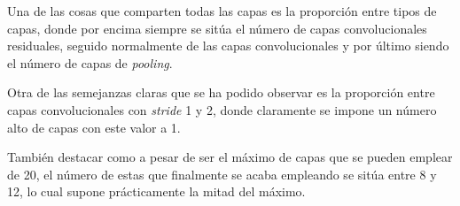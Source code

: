 Una de las cosas que comparten todas las capas es la proporción entre tipos de capas, donde por encima siempre se sitúa el número de capas convolucionales residuales, seguido normalmente de las capas convolucionales y por último siendo el número de capas de \textit{pooling}.

Otra de las semejanzas claras que se ha podido observar es la proporción entre capas convolucionales con \textit{stride} 1 y 2, donde claramente se impone un número alto de capas con este valor a 1.

También destacar como a pesar de ser el máximo de capas que se pueden emplear de 20, el número de estas que finalmente se acaba empleando se sitúa entre 8 y 12, lo cual supone prácticamente la mitad del máximo.

\begin{table}[]
\caption{Mejores arquitecturas obtenidas del Experimento 9}
\label{tab:exp9_best_ind}
\centering
{}
\end{table}

